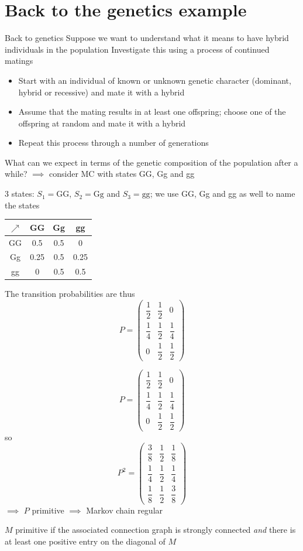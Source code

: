 \documentclass[aspectratio=43]{beamer}
\begin{document}
\section{Back to the genetics example}
\begin{frame}{Back to genetics}
Suppose we want to understand what it means to have hybrid individuals in the population
\vfill
Investigate this using a process of continued matings
\begin{itemize}
\item Start with an individual of known or unknown
genetic character (dominant, hybrid or recessive) and mate it with a hybrid
\item Assume that the mating results in at least one
offspring; choose one of the offspring at random and mate it with a hybrid
\item Repeat this process through a number of generations
\end{itemize}
\vfill
What can we expect in terms of the genetic composition of the population after a while? 
\vfill
$\implies$ consider MC with states GG, Gg and gg
\end{frame}


\begin{frame}
3 states: $S_1=\textrm{GG}$, $S_2=\textrm{Gg}$ and $S_3=\textrm{gg}$; we use GG, Gg and gg as well to name the states
\vfill
\begin{center}
\begin{tabular}{c|ccc}
$\nearrow$ & GG & Gg & gg \\
\hline
GG & 0.5 & 0.5 & 0 \\
Gg & 0.25 & 0.5 & 0.25 \\
gg & 0 & 0.5 & 0.5
\end{tabular}
\end{center}
\vfill
The transition probabilities are thus
\[
P=\begin{pmatrix}
\dfrac 12 & \dfrac 12 & 0 \\[10pt]
\dfrac 14 & \dfrac 12 & \dfrac 14 \\[10pt]
0 & \dfrac 12 & \dfrac 12
\end{pmatrix}
\]
\end{frame}

\begin{frame}
\[
P=\begin{pmatrix}
\dfrac 12 & \dfrac 12 & 0 \\[10pt]
\dfrac 14 & \dfrac 12 & \dfrac 14 \\[10pt]
0 & \dfrac 12 & \dfrac 12
\end{pmatrix}
\]
so
\[
P^2=\begin{pmatrix}
\dfrac 38 & \dfrac 12 & \dfrac 18 \\[10pt]
\dfrac 14 & \dfrac 12 & \dfrac 14 \\[10pt]
\dfrac 18 & \dfrac 12 & \dfrac 38
\end{pmatrix}
\]
\vfill
$\implies$ $P$ primitive $\implies$ Markov chain regular
\vfill
\begin{theorem}
$M$ primitive if the associated connection graph is strongly connected \emph{and} there is at least one positive entry on the diagonal of $M$
\end{theorem}
\end{frame}
\end{document}
